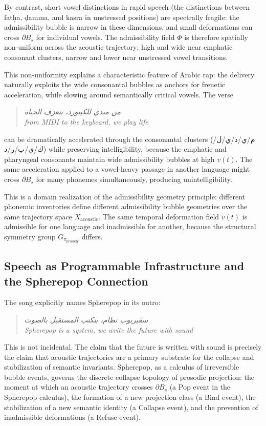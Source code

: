 \documentclass[12pt, a4paper]{article}
\theoremstyle{essaystyle}
\begin{document}
By contrast, short vowel distinctions in rapid speech (the distinctions between
fatḥa, ḍamma, and kasra in unstressed positions) are spectrally fragile: the
admissibility bubble is narrow in these dimensions, and small deformations can cross
$\partial B_s$ for individual vowels. The admissibility field $\Phi$ is therefore
spatially non-uniform across the acoustic trajectory: high and wide near emphatic
consonant clusters, narrow and lower near unstressed vowel transitions.

This non-uniformity explains a characteristic feature of Arabic rap: the delivery
naturally exploits the wide consonantal bubbles as anchors for frenetic acceleration,
while slowing around semantically critical vowels. The verse

\begin{quote}
\textit{من ميدي للكيبورد، بنعزف الحياة} \\
\textit{from MIDI to the keyboard, we play life}
\end{quote}

can be dramatically accelerated through the consonantal clusters
(م/ي/د/ي/ل/ك/ي/ب/ر/د) while preserving intelligibility, because the emphatic
and pharyngeal consonants maintain wide admissibility bubbles at high $v(t)$. The
same acceleration applied to a vowel-heavy passage in another language might cross
$\partial B_s$ for many phonemes simultaneously, producing unintelligibility.

This is a domain realization of the admissibility geometry principle: different
phonemic inventories define different admissibility bubble geometries over the same
trajectory space $X_{\mathrm{acoustic}}$. The same temporal deformation field $v(t)$
is admissible for one language and inadmissible for another, because the structural
symmetry group $G_{\pi_{\mathrm{prosody}}}$ differs.

\subsection{Speech as Programmable Infrastructure and the Spherepop Connection}

The song explicitly names Spherepop in its outro:

\begin{quote}
\textit{سفيربوب نظام، بنكتب المستقبل بالصوت} \\
\textit{Spherepop is a system, we write the future with sound}
\end{quote}

This is not incidental. The claim that the future is written with sound is precisely
the claim that acoustic trajectories are a primary substrate for the collapse and
stabilization of semantic invariants. Spherepop, as a calculus of irreversible bubble
events, governs the discrete collapse topology of prosodic projection: the moment
at which an acoustic trajectory crosses $\partial B_s$ (a Pop event in the Spherepop
calculus), the formation of a new projection class (a Bind event), the stabilization
of a new semantic identity (a Collapse event), and the prevention of inadmissible
deformations (a Refuse event).
\end{document}
